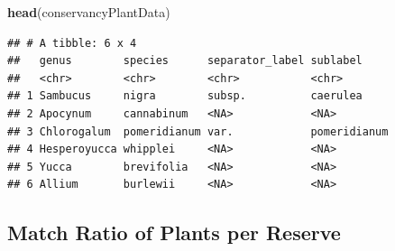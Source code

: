 \documentclass[]{article}
\newenvironment{Shaded}{\begin{snugshade}}{\end{snugshade}}
\newcommand{\KeywordTok}[1]{\textcolor[rgb]{0.13,0.29,0.53}{\textbf{#1}}}
\newcommand{\NormalTok}[1]{#1}
\begin{document}
\begin{Shaded}
\begin{Highlighting}[]
\KeywordTok{head}\NormalTok{(conservancyPlantData)}
\end{Highlighting}
\end{Shaded}

\begin{verbatim}
## # A tibble: 6 x 4
##   genus        species      separator_label sublabel    
##   <chr>        <chr>        <chr>           <chr>       
## 1 Sambucus     nigra        subsp.          caerulea    
## 2 Apocynum     cannabinum   <NA>            <NA>        
## 3 Chlorogalum  pomeridianum var.            pomeridianum
## 4 Hesperoyucca whipplei     <NA>            <NA>        
## 5 Yucca        brevifolia   <NA>            <NA>        
## 6 Allium       burlewii     <NA>            <NA>
\end{verbatim}

\subsection{Match Ratio of Plants per
Reserve}\label{match-ratio-of-plants-per-reserve}
\end{document}
